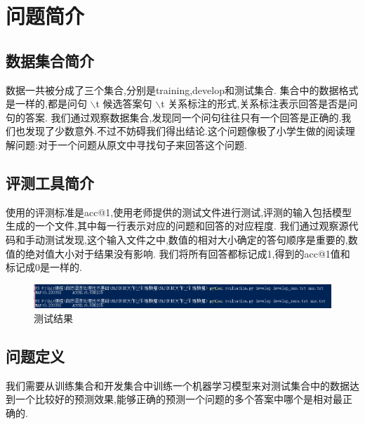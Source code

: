 \documentclass[a4paper,12pt]{report}
\begin{document}
\chapter{问题简介}
\setcounter{page}{1}
\begin{spacing}{1.5}
\songti{}

\section{数据集合简介}
数据一共被分成了三个集合,分别是training,develop和测试集合.
集合中的数据格式是一样的,都是问句  $\backslash$t 候选答案句 $\backslash$t 关系标注的形式,关系标注表示回答是否是问句的答案.
我们通过观察数据集合,发现同一个问句往往只有一个回答是正确的.我们也发现了少数意外.不过不妨碍我们得出结论.这个问题像极了小学生做的阅读理解问题:对于一个问题从原文中寻找句子来回答这个问题.

\section{评测工具简介}

使用的评测标准是acc@1,使用老师提供的测试文件进行测试,评测的输入包括模型生成的一个文件,其中每一行表示对应的问题和回答的对应程度.
我们通过观察源代码和手动测试发现,这个输入文件之中,数值的相对大小确定的答句顺序是重要的,数值的绝对值大小对于结果没有影响.
我们将所有回答都标记成1,得到的acc@1值和标记成0是一样的.


\begin{figure}[htbp]
	\centering
	\includegraphics [width=1.0\textwidth]{figure//ceshi.png}
	\caption{测试结果}\label{测试结果}
\end{figure}


\section{问题定义}
我们需要从训练集合和开发集合中训练一个机器学习模型来对测试集合中的数据达到一个比较好的预测效果,能够正确的预测一个问题的多个答案中哪个是相对最正确的.

\end{spacing}



\end{document}
